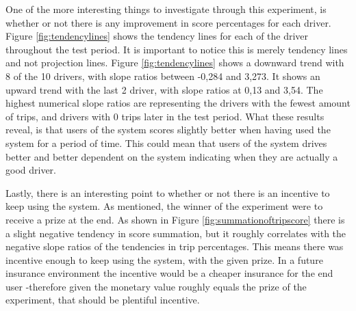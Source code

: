 One of the more interesting things to investigate through this experiment, is whether or not there is any improvement in score percentages for each driver. Figure \ref{fig:tendencylines} shows the tendency lines for each of the driver throughout the test period. It is important to notice this is merely tendency lines and not projection lines. Figure \ref{fig:tendencylines} shows a downward trend with 8 of the 10 drivers, with slope ratios between -0,284 and 3,273. It shows an upward trend with the last 2 driver, with slope ratios at 0,13 and 3,54. The highest numerical slope ratios are representing the drivers with the fewest amount of trips, and drivers with 0 trips later in the test period. What these results reveal, is that users of the system scores slightly better when having used the system for a period of time. This could mean that users of the system drives better and better dependent on the system indicating when they are actually a good driver.


Lastly, there is an interesting point to whether or not there is an incentive to keep using the system. As mentioned, the winner of the experiment were to receive a prize at the end. As shown in Figure \ref{fig:summationoftripscore} there is a slight negative tendency in score summation, but it roughly correlates with the negative slope ratios of the tendencies in trip percentages. This means there was incentive enough to keep using the system, with the given prize. In a future insurance environment the incentive would be a cheaper insurance for the end user -therefore given the monetary value roughly equals the prize of the experiment, that should be plentiful incentive.
 